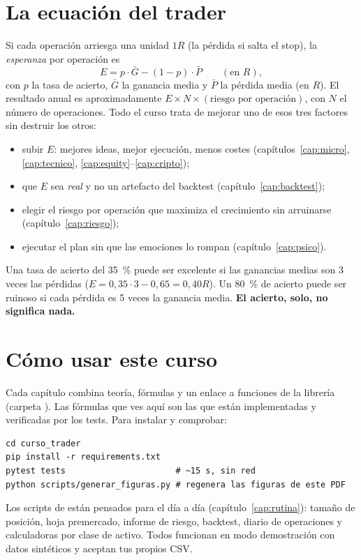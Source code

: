 \section{La ecuación del trader}
Si cada operación arriesga una unidad $1R$ (la pérdida si salta el stop), la \emph{esperanza} por
operación es
\begin{equation}\label{eq:esperanza}
  E = p\cdot \bar G - (1-p)\cdot \bar P \qquad (\text{en } R),
\end{equation}
con $p$ la tasa de acierto, $\bar G$ la ganancia media y $\bar P$ la pérdida media (en $R$). El
resultado anual es aproximadamente $E \times N \times (\text{riesgo por operación})$, con $N$ el número
de operaciones. Todo el curso trata de mejorar uno de esos tres factores sin destruir los otros:
\begin{itemize}
\item subir $E$: mejores ideas, mejor ejecución, menos costes (capítulos~\ref{cap:micro}, \ref{cap:tecnico}, \ref{cap:equity}--\ref{cap:cripto});
\item que $E$ sea \emph{real} y no un artefacto del backtest (capítulo~\ref{cap:backtest});
\item elegir el riesgo por operación que maximiza el crecimiento sin arruinarse (capítulo~\ref{cap:riesgo});
\item ejecutar el plan sin que las emociones lo rompan (capítulo~\ref{cap:psico}).
\end{itemize}

\begin{clave}
Una tasa de acierto del 35~\% puede ser excelente si las ganancias medias son 3 veces las pérdidas
($E = 0{,}35\cdot3 - 0{,}65 = 0{,}40R$). Un 80~\% de acierto puede ser ruinoso si cada pérdida es 5
veces la ganancia media. \textbf{El acierto, solo, no significa nada.}
\end{clave}

\section{Cómo usar este curso}
Cada capítulo combina teoría, fórmulas y un enlace a funciones de la librería 
(carpeta ). Las fórmulas que ves aquí son las que están implementadas y
verificadas por los tests. Para instalar y comprobar:
\begin{lstlisting}
cd curso_trader
pip install -r requirements.txt
pytest tests                      # ~15 s, sin red
python scripts/generar_figuras.py # regenera las figuras de este PDF
\end{lstlisting}
Los scripts de  están pensados para el día a día (capítulo~\ref{cap:rutina}):
tamaño de posición, hoja premercado, informe de riesgo, backtest, diario de operaciones y
calculadoras por clase de activo. Todos funcionan en modo demostración con datos sintéticos y aceptan
tus propios CSV.

